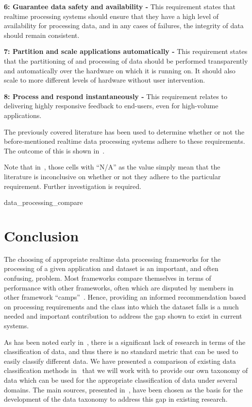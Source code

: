 \noindent \textbf{6: Guarantee data safety and availability -} This requirement states that realtime processing systems
should ensure that they have a high level of availability for processing data, and in any cases of failures, the integrity
of data should remain consistent.

\noindent \textbf{7: Partition and scale applications automatically -} This requirement states that the partitioning of
and processing of data should be performed transparently and automatically over the hardware on which it is running on.
It should also scale to more different levels of hardware without user intervention.

\noindent \textbf{8: Process and respond instantaneously -} This requirement relates to delivering highly responsive
feedback to end-users, even for high-volume applications.

The previously covered literature has been used to determine whether or not the before-mentioned realtime data processing
systems adhere to these requirements. The outcome of this is shown in~.

Note that in~, those cells with ``N/A'' as the value simply mean that the literature
is inconclusive on whether or not they adhere to the particular requirement. Further investigation is required.

{data_processing_compare}




\section{Conclusion} %
\label{sec:conclusion_litrev}

The choosing of appropriate realtime data processing frameworks for the processing of a given application and dataset
is an important, and often confusing, problem. Most frameworks compare themselves in terms of performance with other
frameworks, often which are disputed by members in other framework ``camps''~\cite{web_slideshare_b,web_slideshare_a}.
Hence, providing an informed recommendation based on processing requirements and the class into which the dataset
falls is a much needed and important contribution to address the gap shown to exist in current systems.

As has been noted early in~, there is a significant lack of research in terms of the
classification of data, and thus there is no standard metric that can be used to easily classify different data. We have
presented a comparison of existing data classification methods in~ that we will work with
to provide our own taxonomy of data which can be used for the appropriate classification of data under several domains.
The main sources, presented in~, have been chosen as the basis for the development of
the data taxonomy to address this gap in existing research.

